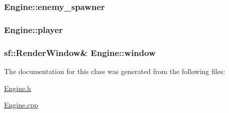 \subsubsection[{enemy\+\_\+spawner}]{ Engine\+::enemy\+\_\+spawner\hspace{0.3cm}{\ttfamily [protected]}}\label{class_engine_ac38501b7527b3c8ce22f8b31a13821ea}
\hypertarget{class_engine_abd0ff72a70b7643680cff6cd0513620f}{}
\subsubsection[{player}]{ Engine\+::player}\label{class_engine_abd0ff72a70b7643680cff6cd0513620f}
\hypertarget{class_engine_ae5fb055a0acce41034a9bff218dd87b1}{}
\subsubsection[{window}]{\setlength{\rightskip}{0pt plus 5cm}sf\+::\+Render\+Window\& Engine\+::window\hspace{0.3cm}{\ttfamily [protected]}}\label{class_engine_ae5fb055a0acce41034a9bff218dd87b1}


The documentation for this class was generated from the following files\+:\begin{DoxyCompactItemize}
\item 
\hyperlink{_engine_8h}{Engine.\+h}\item 
\hyperlink{_engine_8cpp}{Engine.\+cpp}\end{DoxyCompactItemize}
